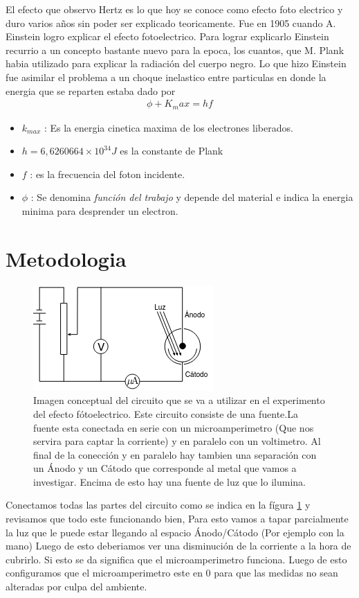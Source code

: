 \documentclass[a4paper, amsfonts, amssymb, amsmath, reprint, showkeys, nofootinbib, twoside]{revtex4-1}
\begin{document}
El efecto que observo Hertz es lo que hoy se conoce como efecto foto electrico y duro varios años sin poder ser explicado teoricamente. Fue en 1905 cuando A. Einstein logro explicar el efecto fotoelectrico. Para lograr explicarlo Einstein recurrio a un concepto bastante nuevo para la epoca, los cuantos, que M. Plank habia utilizado para explicar la radiación del cuerpo negro.\cite{Unal_Moderna} Lo que hizo Einstein fue asimilar el problema a un choque inelastico entre particulas en donde la energia que se reparten estaba dado por \cite{Texto_Guia} 
\begin{align*}
   \phi + K_max = hf
\end{align*}
\begin{itemize}
   \item $k_{max}$ : Es la energia cinetica maxima  de los electrones liberados.
   \item $h=6,6260664\times10^{34}J$ es la constante de Plank
   \item $f$ : es la frecuencia del foton incidente.
   \item $\phi$ : Se denomina \textit{función del trabajo} y depende del material e indica la energia minima para desprender un electron.
\end{itemize}
\section{Metodologia}
\begin{figure}[H]
   \centering
   \includegraphics[scale=0.6]{Circuito.png}
   \caption{Imagen conceptual del circuito que se va a utilizar en el experimento del efecto fótoelectrico. Este circuito consiste de una fuente.La fuente esta conectada en serie con un microamperimetro (Que nos servira para captar la corriente) y en paralelo con un voltimetro. Al final de la conección y en paralelo hay tambien una separación con un Ánodo y un Cátodo que corresponde al metal que vamos a investigar. Encima de esto hay una fuente de luz que lo ilumina.}
   \label{fig:circuito}
\end{figure}
Conectamos todas las partes del circuito como se indica en la fígura \ref{fig:circuito} y revisamos que todo este funcionando bien, Para esto vamos a tapar parcialmente la luz que le puede estar llegando al espacio Ánodo/Cátodo (Por ejemplo con la mano) Luego de esto deberiamos ver una disminución de la corriente a la hora de cubrirlo. Si esto se da significa que el microamperimetro funciona. Luego de esto configuramos que el microamperimetro este en 0 para que las medidas no sean alteradas por culpa del ambiente.\cite{Guia}
\end{document}
